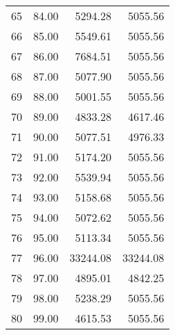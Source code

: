 \begin{table}[ht]
\begin{tabular}{rrrr}
  65 & 84.00 & 5294.28 & 5055.56 \\ 
  66 & 85.00 & 5549.61 & 5055.56 \\ 
  67 & 86.00 & 7684.51 & 5055.56 \\ 
  68 & 87.00 & 5077.90 & 5055.56 \\ 
  69 & 88.00 & 5001.55 & 5055.56 \\ 
  70 & 89.00 & 4833.28 & 4617.46 \\ 
  71 & 90.00 & 5077.51 & 4976.33 \\ 
  72 & 91.00 & 5174.20 & 5055.56 \\ 
  73 & 92.00 & 5539.94 & 5055.56 \\ 
  74 & 93.00 & 5158.68 & 5055.56 \\ 
  75 & 94.00 & 5072.62 & 5055.56 \\ 
  76 & 95.00 & 5113.34 & 5055.56 \\ 
  77 & 96.00 & 33244.08 & 33244.08 \\ 
  78 & 97.00 & 4895.01 & 4842.25 \\ 
  79 & 98.00 & 5238.29 & 5055.56 \\ 
  80 & 99.00 & 4615.53 & 5055.56 \\ 
   \hline
\end{tabular}
\end{table}
